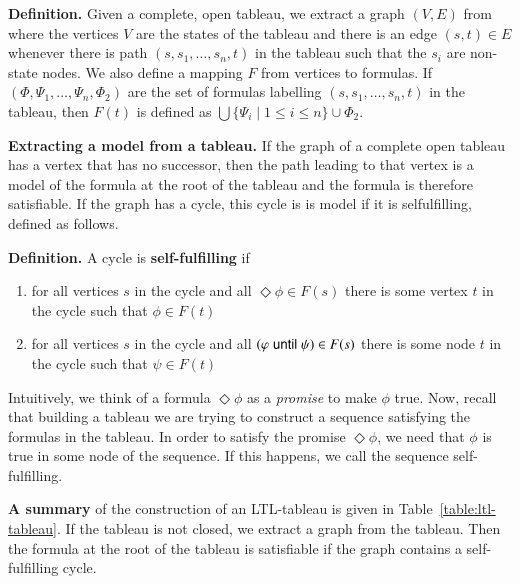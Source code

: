 \medskip\noindent\textbf{Definition. } Given a complete, open tableau,
we extract a graph $(V,E)$ from where the vertices $V$ are the states
of the tableau and there is an edge $(s,t)\in E$ whenever there is
path $(s,s_1,\ldots, s_n,t)$ in the tableau such that the $s_i$ are
non-state nodes. We also define a mapping $F$ from vertices to
formulas. If $(\Phi,\Psi_1,\ldots, \Psi_n,\Phi_2)$ are the set of
formulas labelling $(s,s_1,\ldots, s_n,t)$ in the tableau, then $F(t)$
is defined as $\bigcup\{\Psi_i\mid 1\le i \le
n\}\cup\Phi_2$.

\medskip\noindent\textbf{Extracting a model from a tableau. }  If the
graph of a complete open tableau has a vertex that has no successor,
then the path leading to that vertex is a model of the formula at the
root of the tableau and the formula is therefore satisfiable. If the
graph has a cycle, this cycle is is model if it is selfulfilling,
defined as follows.

\medskip\noindent\textbf{Definition. }  A cycle is
\textbf{self-fulfilling} if
\begin{enumerate}
\item for all vertices $s$ in the cycle and all $\Diamond\phi\in F(s)$
  there is some vertex $t$ in the cycle such that $\phi\in F(t)$
\item for all vertices $s$ in the cycle and all $(\varphi\mathrel{\mathsf{until}}\psi)\in
  F(s)$ there is some node $t$ in the cycle such that $\psi \in F(t)$
\end{enumerate}
Intuitively, we think of a formula $\Diamond\phi$ as a \emph{promise}
to make $\phi$ true. Now, recall that building a tableau we are trying
to construct a sequence satisfying the formulas in the tableau. In
order to satisfy the promise $\Diamond\phi$, we need that $\phi$ is
true in some node of the sequence. If this happens, we call the
sequence self-fulfilling.

\medskip\noindent\textbf{A summary} of the construction of an
LTL-tableau is given in Table~\ref{table:ltl-tableau}. If the tableau
is not closed, we extract a graph from the tableau. Then the formula
at the root of the tableau is satisfiable if the graph contains a
self-fulfilling cycle.

